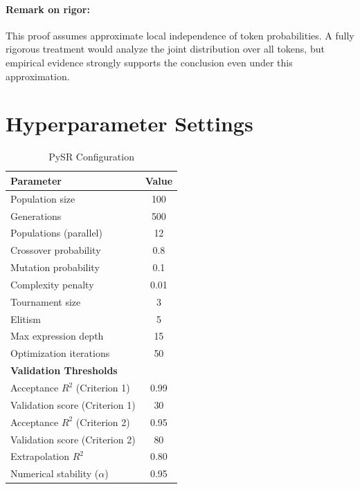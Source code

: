 \paragraph{Remark on rigor:} This proof assumes approximate local independence of token probabilities. A fully rigorous treatment would analyze the joint distribution over all tokens, but empirical evidence strongly supports the conclusion even under this approximation.


\section{Hyperparameter Settings}
\label{app:hyperparameters}

\begin{table}[H]
\centering
\caption{PySR Configuration}
\label{tab:hyperparameters}
\begin{tabular}{@{}lc@{}}
\toprule
\textbf{Parameter} & \textbf{Value} \\
\midrule
Population size & 100 \\
Generations & 500 \\
Populations (parallel) & 12 \\
Crossover probability & 0.8 \\
Mutation probability & 0.1 \\
Complexity penalty & 0.01 \\
Tournament size & 3 \\
Elitism & 5 \\
Max expression depth & 15 \\
Optimization iterations & 50 \\
\midrule
\textbf{Validation Thresholds} & \\
\midrule
Acceptance $R^2$ (Criterion 1) & 0.99 \\
Validation score (Criterion 1) & 30 \\
Acceptance $R^2$ (Criterion 2) & 0.95 \\
Validation score (Criterion 2) & 80 \\
Extrapolation $R^2$ & 0.80 \\
Numerical stability ($\alpha$) & 0.95 \\
\bottomrule
\end{tabular}
\end{table}

